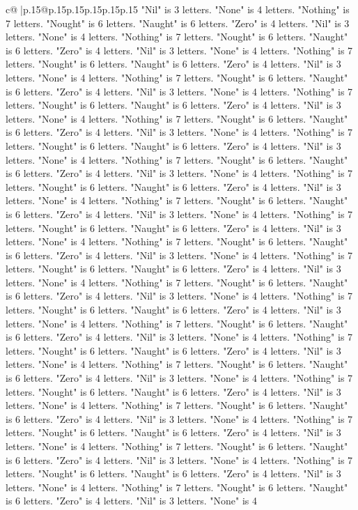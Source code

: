 \documentclass{article}
\begin{document}
{\begin{supertabular}{c@{$\;$}|p{.15\linewidth}@{}p{.15\linewidth}p{.15\linewidth}p{.15\linewidth}p{.15\linewidth}p{.15\linewidth}}
{{{"Nil" is 3 letters. "None" is 4 letters. "Nothing" is 7 letters. "Nought" is 6 letters. "Naught" is 6 letters. "Zero" is 4 letters. "Nil" is 3 letters. "None" is 4 letters. "Nothing" is 7 letters. "Nought" is 6 letters. "Naught" is 6 letters. "Zero" is 4 letters. "Nil" is 3 letters. "None" is 4 letters. "Nothing" is 7 letters. "Nought" is 6 letters. "Naught" is 6 letters. "Zero" is 4 letters. "Nil" is 3 letters. "None" is 4 letters. "Nothing" is 7 letters. "Nought" is 6 letters. "Naught" is 6 letters. "Zero" is 4 letters. "Nil" is 3 letters. "None" is 4 letters. "Nothing" is 7 letters. "Nought" is 6 letters. "Naught" is 6 letters. "Zero" is 4 letters. "Nil" is 3 letters. "None" is 4 letters. "Nothing" is 7 letters. "Nought" is 6 letters. "Naught" is 6 letters. "Zero" is 4 letters. "Nil" is 3 letters. "None" is 4 letters. "Nothing" is 7 letters. "Nought" is 6 letters. "Naught" is 6 letters. "Zero" is 4 letters. "Nil" is 3 letters. "None" is 4 letters. "Nothing" is 7 letters. "Nought" is 6 letters. "Naught" is 6 letters. "Zero" is 4 letters. "Nil" is 3 letters. "None" is 4 letters. "Nothing" is 7 letters. "Nought" is 6 letters. "Naught" is 6 letters. "Zero" is 4 letters. "Nil" is 3 letters. "None" is 4 letters. "Nothing" is 7 letters. "Nought" is 6 letters. "Naught" is 6 letters. "Zero" is 4 letters. "Nil" is 3 letters. "None" is 4 letters. "Nothing" is 7 letters. "Nought" is 6 letters. "Naught" is 6 letters. "Zero" is 4 letters. "Nil" is 3 letters. "None" is 4 letters. "Nothing" is 7 letters. "Nought" is 6 letters. "Naught" is 6 letters. "Zero" is 4 letters. "Nil" is 3 letters. "None" is 4 letters. "Nothing" is 7 letters. "Nought" is 6 letters. "Naught" is 6 letters. "Zero" is 4 letters. "Nil" is 3 letters. "None" is 4 letters. "Nothing" is 7 letters. "Nought" is 6 letters. "Naught" is 6 letters. "Zero" is 4 letters. "Nil" is 3 letters. "None" is 4 letters. "Nothing" is 7 letters. "Nought" is 6 letters. "Naught" is 6 letters. "Zero" is 4 letters. "Nil" is 3 letters. "None" is 4 letters. "Nothing" is 7 letters. "Nought" is 6 letters. "Naught" is 6 letters. "Zero" is 4 letters. "Nil" is 3 letters. "None" is 4 letters. "Nothing" is 7 letters. "Nought" is 6 letters. "Naught" is 6 letters. "Zero" is 4 letters. "Nil" is 3 letters. "None" is 4 letters. "Nothing" is 7 letters. "Nought" is 6 letters. "Naught" is 6 letters. "Zero" is 4 letters. "Nil" is 3 letters. "None" is 4 letters. "Nothing" is 7 letters. "Nought" is 6 letters. "Naught" is 6 letters. "Zero" is 4 letters. "Nil" is 3 letters. "None" is 4 letters. "Nothing" is 7 letters. "Nought" is 6 letters. "Naught" is 6 letters. "Zero" is 4 letters. "Nil" is 3 letters. "None" is 4 letters. "Nothing" is 7 letters. "Nought" is 6 letters. "Naught" is 6 letters. "Zero" is 4 letters. "Nil" is 3 letters. "None" is 4 letters. "Nothing" is 7 letters. "Nought" is 6 letters. "Naught" is 6 letters. "Zero" is 4 letters. "Nil" is 3 letters. "None" is 4 letters. "Nothing" is 7 letters. "Nought" is 6 letters. "Naught" is 6 letters. "Zero" is 4 letters. "Nil" is 3 letters. "None" is 4 letters. "Nothing" is 7 letters. "Nought" is 6 letters. "Naught" is 6 letters. "Zero" is 4 letters. "Nil" is 3 letters. "None" is 4 }}}
\end{supertabular}}
\end{document}

